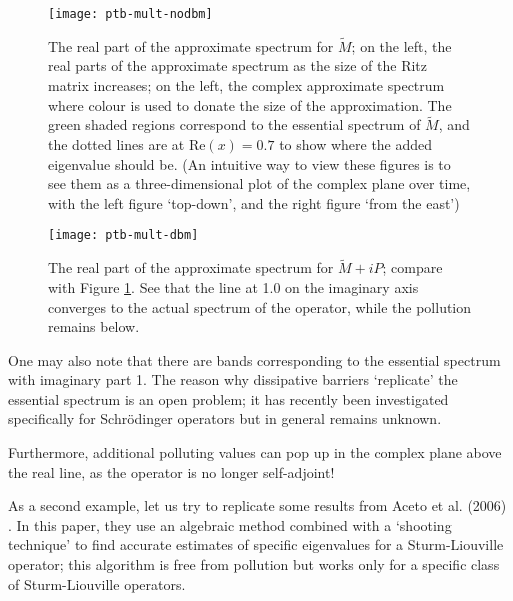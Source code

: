 \documentclass[../main.tex]{subfiles}
\begin{document}
\begin{figure}[p!] 
\texttt{[image: ptb-mult-nodbm]}
\caption{The real part of the approximate spectrum for $\tilde{M}$; on the
	left, the real parts of the approximate
	spectrum as the size of the Ritz matrix increases; on the left, the
	complex approximate spectrum where colour is used to donate the size of
	the approximation. The green shaded regions correspond to the essential
	spectrum of $\tilde{M}$, and the dotted lines are at $\mathrm{Re}(x) =
	0.7$ to show where the added eigenvalue should be. (An intuitive way to
	view these figures is to see them as a three-dimensional plot
	of the complex plane over time, with the left figure `top-down',
	and the right figure `from the east')}
\label{fig:nodbm}
\end{figure}

\begin{figure}[p!] 
\texttt{[image: ptb-mult-dbm]}
\caption{The real part of the approximate spectrum for $\tilde{M}+iP$; compare
	with Figure \ref{fig:nodbm}. See that the line at 1.0 on the imaginary
	axis converges to the actual spectrum of the operator, while the
	pollution remains below.}
\label{fig:dbm}
\end{figure}
\clearpage

\begin{remark}
One may also note that there are bands corresponding to the
essential spectrum with imaginary part 1. The reason why dissipative
barriers `replicate' the essential spectrum is an open problem; it has
recently been investigated specifically for Schr\"odinger operators
\cite{stepanenko2022spectral} but in general remains unknown.

Furthermore, additional polluting values can pop up in the complex plane
above the real line, as the operator is no longer self-adjoint!
\end{remark}

As a second example, let us try to replicate some results from Aceto et al.
(2006) \cite{aceto2006numerical}. In this paper, they use an algebraic method
combined with a `shooting technique' to find accurate estimates of specific
eigenvalues for a Sturm-Liouville operator; this algorithm is free from
pollution but works only for a specific class of Sturm-Liouville operators.
\end{document}
